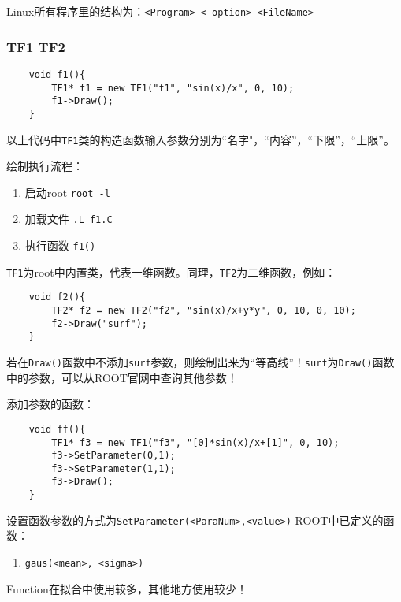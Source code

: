 \documentclass{article}
\begin{document}
Linux所有程序里的结构为：\texttt{<Program> <-option> <FileName>}

\subsubsection{TF1 TF2}
\begin{lstlisting}
    void f1(){
        TF1* f1 = new TF1("f1", "sin(x)/x", 0, 10);
        f1->Draw();
    }
\end{lstlisting}

以上代码中\texttt{TF1}类的构造函数输入参数分别为“名字"，“内容”，“下限”，“上限”。

绘制执行流程：
\begin{enumerate}
    \item 启动root \texttt{root -l}
    \item 加载文件 \texttt{.L f1.C}
    \item 执行函数 \texttt{f1()}
\end{enumerate}

\texttt{TF1}为root中内置类，代表一维函数。同理，\texttt{TF2}为二维函数，例如：
\begin{lstlisting}
    void f2(){
        TF2* f2 = new TF2("f2", "sin(x)/x+y*y", 0, 10, 0, 10);
        f2->Draw("surf");
    }
\end{lstlisting}

若在\texttt{Draw()}函数中不添加\texttt{surf}参数，则绘制出来为“等高线”！\texttt{surf}为\texttt{Draw()}函数中的参数，可以从ROOT官网中查询其他参数！

添加参数的函数：
\begin{lstlisting}
    void ff(){
        TF1* f3 = new TF1("f3", "[0]*sin(x)/x+[1]", 0, 10);
        f3->SetParameter(0,1);
        f3->SetParameter(1,1);
        f3->Draw();
    }
\end{lstlisting}

设置函数参数的方式为\texttt{SetParameter(<ParaNum>,<value>)}
\newline
ROOT中已定义的函数：
\begin{enumerate}
    \item \texttt{gaus(<mean>, <sigma>)}
\end{enumerate}

Function在拟合中使用较多，其他地方使用较少！
\end{document}
